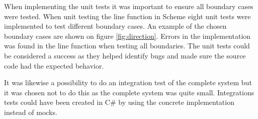 When implementing the unit tests it was important to ensure all boundary cases were tested. When unit testing the line function in Scheme eight unit tests were implemented to test different boundary cases. An example of the chosen boundary cases are shown on figure \ref{fig:direction}. Errors in the implementation was found in the line function when testing all boundaries. The unit tests could be considered a success as they helped identify bugs and made sure the source code had the expected behavior.

\FloatBarrier

It was likewise a possibility to do an integration test of the complete system but it was chosen not to do this as the complete system was quite small. Integrations tests could have been created in C\# by using the concrete implementation instead of mocks.